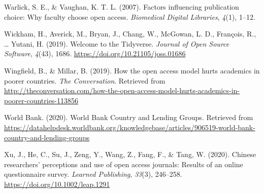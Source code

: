 \documentclass[english,man]{apa6}
\begin{document}
\leavevmode\hypertarget{ref-warlick_factors_2007}{}%
Warlick, S. E., \& Vaughan, K. T. L. (2007). Factors influencing publication choice: Why faculty choose open access. \emph{Biomedical Digital Libraries}, \emph{4}(1), 1--12.

\leavevmode\hypertarget{ref-wickham_welcome_2019}{}%
Wickham, H., Averick, M., Bryan, J., Chang, W., McGowan, L. D., François, R., \ldots{} Yutani, H. (2019). Welcome to the Tidyverse. \emph{Journal of Open Source Software}, \emph{4}(43), 1686. \url{https://doi.org/10.21105/joss.01686}

\leavevmode\hypertarget{ref-wingfield_how_2019}{}%
Wingfield, B., \& Millar, B. (2019). How the open access model hurts academics in poorer countries. \emph{The Conversation}. Retrieved from \url{http://theconversation.com/how-the-open-access-model-hurts-academics-in-poorer-countries-113856}

\leavevmode\hypertarget{ref-world_bank_world_2020}{}%
World Bank. (2020). World Bank Country and Lending Groups. Retrieved from \url{https://datahelpdesk.worldbank.org/knowledgebase/articles/906519-world-bank-country-and-lending-groups}

\leavevmode\hypertarget{ref-xu_chinese_2020}{}%
Xu, J., He, C., Su, J., Zeng, Y., Wang, Z., Fang, F., \& Tang, W. (2020). Chinese researchers' perceptions and use of open access journals: Results of an online questionnaire survey. \emph{Learned Publishing}, \emph{33}(3), 246--258. \url{https://doi.org/10.1002/leap.1291}

\endgroup
\end{document}
